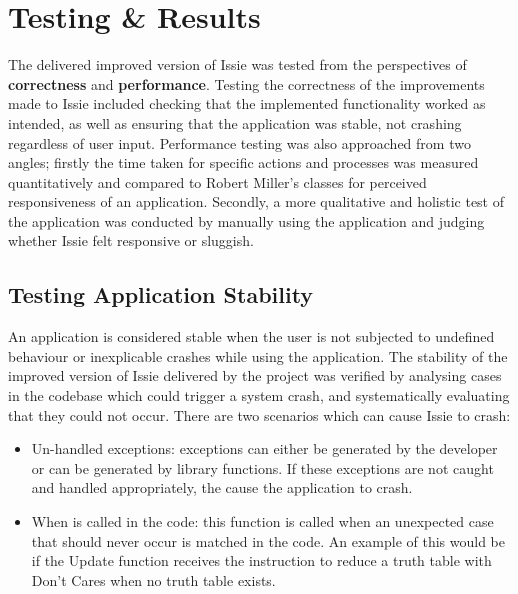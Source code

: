 \chapter{Testing \& Results}
The delivered improved version of Issie was tested from the perspectives of \textbf{correctness} and \textbf{performance}. Testing the correctness of the improvements made to Issie included checking that the implemented functionality worked as intended, as well as ensuring that the application was stable, not crashing regardless of user input. Performance testing was also approached from two angles; firstly the time taken for specific actions and processes was measured quantitatively and compared to Robert Miller's \cite{Miller1968ResponseTI} classes for perceived responsiveness of an application. Secondly, a more qualitative and holistic test of the application was conducted by manually using the application and judging whether Issie felt responsive or sluggish.

\section{Testing Application Stability}
An application is considered stable when the user is not subjected to undefined behaviour or inexplicable crashes while using the application. The stability of the improved version of Issie delivered by the project was verified by analysing cases in the codebase which could trigger a system crash, and systematically evaluating that they could not occur. There are two scenarios which can cause Issie to crash:
\begin{itemize}
    \item Un-handled exceptions: exceptions can either be generated by the developer or can be generated by library functions. If these exceptions are not caught and handled appropriately, the cause the application to crash.
    \item When  is called in the code: this function is called when an unexpected case that should never occur is matched in the code. An example of this would be if the Update function receives the instruction to reduce a truth table with Don't Cares when no truth table exists.
\end{itemize}

